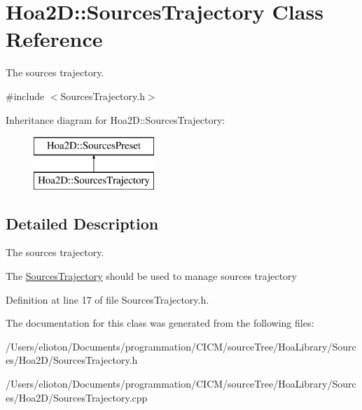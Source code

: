\hypertarget{class_hoa2_d_1_1_sources_trajectory}{\section{Hoa2\-D\-:\-:Sources\-Trajectory Class Reference}
\label{class_hoa2_d_1_1_sources_trajectory}
}


The sources trajectory.  




{\ttfamily \#include $<$Sources\-Trajectory.\-h$>$}

Inheritance diagram for Hoa2\-D\-:\-:Sources\-Trajectory\-:\begin{figure}[H]
\begin{center}
\leavevmode
\includegraphics[height=2.000000cm]{class_hoa2_d_1_1_sources_trajectory}
\end{center}
\end{figure}


\subsection{Detailed Description}
The sources trajectory. 

The \hyperlink{class_hoa2_d_1_1_sources_trajectory}{Sources\-Trajectory} should be used to manage sources trajectory 

Definition at line 17 of file Sources\-Trajectory.\-h.



The documentation for this class was generated from the following files\-:\begin{DoxyCompactItemize}
\item 
/\-Users/elioton/\-Documents/programmation/\-C\-I\-C\-M/source\-Tree/\-Hoa\-Library/\-Sources/\-Hoa2\-D/Sources\-Trajectory.\-h\item 
/\-Users/elioton/\-Documents/programmation/\-C\-I\-C\-M/source\-Tree/\-Hoa\-Library/\-Sources/\-Hoa2\-D/Sources\-Trajectory.\-cpp\end{DoxyCompactItemize}
